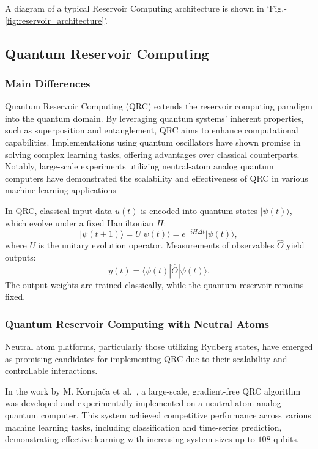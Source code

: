 \documentclass[conference]{IEEEtran}
\begin{document}
A diagram of a typical Reservoir Computing architecture is shown in `Fig.-\ref{fig:reservoir_architecture}'.




\subsection{Quantum Reservoir Computing}

\subsubsection{Main Differences}
Quantum Reservoir Computing (QRC) extends the reservoir 
computing paradigm into the quantum domain. By leveraging quantum systems' 
inherent properties, such as superposition and entanglement, QRC aims 
to enhance computational capabilities. Implementations using quantum 
oscillators have shown promise in solving complex learning tasks, 
offering advantages over classical counterparts. Notably, large-scale 
experiments utilizing neutral-atom analog quantum computers have demonstrated 
the scalability and effectiveness of QRC in various machine learning applications~\cite{kornjavcaLargescaleQuantumReservoir2024}


In QRC, classical input data \( u(t) \) is encoded into quantum states \( |\psi(t)\rangle \),
which evolve under a fixed Hamiltonian \( H \):
\begin{equation}
    |\psi(t+1)\rangle = U |\psi(t)\rangle = e^{-iH\Delta t} |\psi(t)\rangle,
\end{equation}
where \( U \) is the unitary evolution operator. Measurements of observables \( \hat{O} \) yield outputs:
\begin{equation}
    y(t) = \langle \psi(t) | \hat{O} | \psi(t) \rangle.
\end{equation}
The output weights are trained classically, while the quantum reservoir remains fixed.

\subsubsection{Quantum Reservoir Computing with Neutral Atoms}
Neutral atom platforms, particularly those utilizing Rydberg states, have emerged as promising candidates for implementing QRC due to their scalability and controllable interactions.

In the work by M. Kornjača et al.~\cite{kornjavcaLargescaleQuantumReservoir2024}, a large-scale, gradient-free QRC algorithm was developed and experimentally implemented on a neutral-atom analog quantum computer. This system achieved competitive performance across various machine learning tasks, including classification and time-series prediction, demonstrating effective learning with increasing system sizes up to $108$ qubits.
\end{document}
